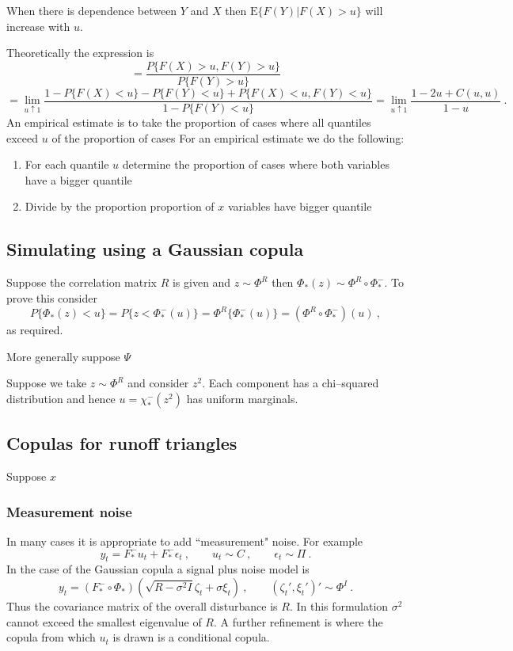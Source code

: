 \documentclass[a4paper,12pt]{article}
\newcommand{\eps}{\epsilon}
\newcommand{\E}{{\mathrm E}}
\begin{document}
When there is dependence between
$Y$ and $X$ then $\E\{F(Y)|F(X)>u\}$ will increase with $u$.

 Theoretically the expression is
$$= \frac{P\{F(X)>u,F(Y)>u\}}{P\{F(Y)>u\}}$$$$=\lim_{u\uparrow 1} \frac{1-P\{F(X)<u\}-P\{F(Y)<u\}+P\{F(X)<u,F(Y)<u\}}{1-P\{F(Y)<u\}}=\lim_{u\uparrow 1} \frac{1-2u+C(u,u)}{1-u}\ .
$$
An empirical estimate is to take the proportion of cases where all quantiles exceed $u$ of the proportion of cases
For an empirical estimate we do the following:
\begin{enumerate}
    \item For each quantile $u$ determine the proportion of cases where both variables have a bigger quantile
    \item Divide by the proportion proportion of $x$ variables have bigger quantile
\end{enumerate}


\subsection*{Simulating using a Gaussian copula}

Suppose the correlation matrix $R$ is given and $z\sim \Phi^R$ then $\Phi_*(z)\sim\Phi^R\circ\Phi_*^- $.  To prove this consider
$$
P\{\Phi_*(z)<u\}=P\{z<\Phi_*^-(u)\}=\Phi^R\{\Phi_*^-(u)\}=(\Phi^R\circ\Phi_*^-)(u)\ ,
$$
as required.


More generally suppose $\Psi$


Suppose we take $z\sim\Phi^R$ and consider $z^2$.  Each component has a chi--squared distribution and hence $u=\chi_*^-(z^2)$ has uniform marginals.


\subsection*{Copulas for runoff triangles}

Suppose $x$

\subsubsection{Measurement noise}
In many cases it is appropriate to add ``measurement" noise.  For example
$$
y_t = F_*^-u_t+F_*^-\eps_t\ , \qquad u_t\sim C\ ,\qquad \eps_t\sim \Pi\ .
$$
In the case of the Gaussian copula a signal plus noise model is
$$
y_t = (F_*^-\circ \Phi_*)(\sqrt {R-\sigma^2I}\zeta_t +\sigma\xi_t)\ ,\qquad (\zeta_t',\xi_t')'\sim \Phi^I\ .
$$
Thus the covariance matrix of the overall disturbance is $R$.  In this formulation $\sigma^2$ cannot exceed the smallest eigenvalue of $R$. A further refinement is where the copula from which $u_t$ is drawn is a conditional copula.

%
\end{document}
